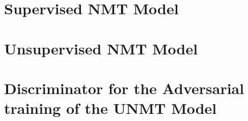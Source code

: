 \documentclass[]{article}
\begin{document}
\small




\begin{appendices}
\section{Supervised NMT Model}
\label{appendix:supervised}


\section{Unsupervised NMT Model}
\label{appendix:unsupervised}


\section{Discriminator for the Adversarial training of the UNMT Model}
\label{appendix:discriminator}


\end{appendices}
\end{document}
